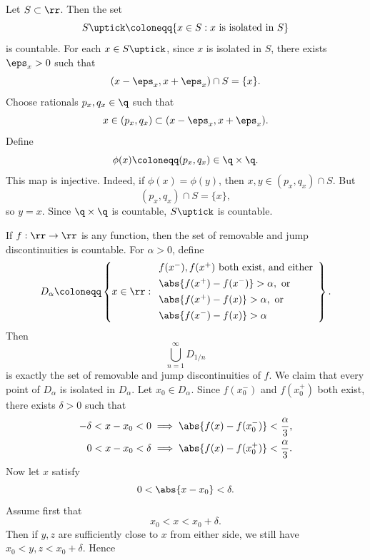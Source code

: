 \begin{lemma}{
    Let $S\subset\rr$.
    Then the set
    \[
        S\uptick \coloneqq \{x\in S : \text{$x$ is isolated in $S$}\}
    \]
    is countable.
}
    For each $x\in S\uptick$, since $x$ is isolated in $S$, there exists $\eps_x>0$ such that
    \[
        (x-\eps_x,x+\eps_x)\cap S = \{x\}.
    \]
    Choose rationals $p_x,q_x\in\q$ such that
    \[
        x\in (p_x,q_x)\subset (x-\eps_x,x+\eps_x).
    \]
    Define
    \[
        \phi(x)\coloneqq (p_x,q_x)\in \q\times\q.
    \]
    This map is injective.
    Indeed, if $\phi(x)=\phi(y)$, then $x,y\in (p_x,q_x)\cap S$.
    But
    \[
        (p_x,q_x)\cap S = \{x\},
    \]
    so $y=x$.
    Since $\q\times\q$ is countable, $S\uptick$ is countable.
\end{lemma}

\begin{theorem}{
    If $f:\rr\to\rr$ is any function, then the set of removable and jump discontinuities is countable.
}
    For $\alpha > 0$, define
    \[
        D_\alpha \coloneqq \left\{x\in\rr :
                               \begin{array}{l}
                                   f(x^-),f(x^+) \text{ both exist, and either}\\[4pt]
                                   \abs{f(x^+) - f(x^-)} > \alpha,\ \text{or}\\[4pt]
                                   \abs{f(x^+) - f(x)} > \alpha,\ \text{or}\\[4pt]
                                   \abs{f(x^-) - f(x)} > \alpha
                               \end{array}
        \right\}.
    \]
    Then
    \[
        \bigcup_{n=1}^\infty D_{1/n}
    \]
    is exactly the set of removable and jump discontinuities of $f$.
    We claim that every point of $D_\alpha$ is isolated in $D_\alpha$.
    Let $x_0\in D_\alpha$.
    Since $f(x_0^-)$ and $f(x_0^+)$ both exist, there exists $\delta > 0$ such that
    \begin{align*}
        -\delta < x-x_0 < 0 &\implies \abs{f(x)-f(x_0^-)} < \frac{\alpha}{3},\\
        0 < x-x_0 < \delta &\implies \abs{f(x)-f(x_0^+)} < \frac{\alpha}{3}.
    \end{align*}
    Now let $x$ satisfy
    \[
        0 < \abs{x-x_0} < \delta.
    \]
    Assume first that
    \[
        x_0 < x < x_0+\delta.
    \]
    Then if $y,z$ are sufficiently close to $x$ from either side, we still have $x_0<y,z<x_0+\delta$.
    Hence

\end{theorem}
